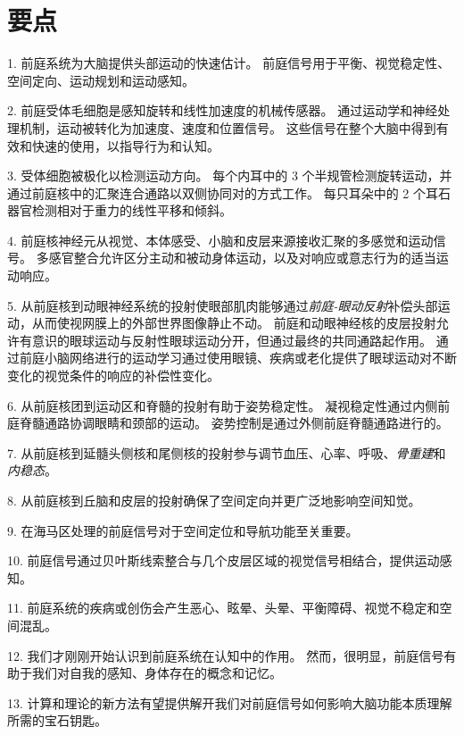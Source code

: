 \section{要点}

1. 前庭系统为大脑提供头部运动的快速估计。
前庭信号用于平衡、视觉稳定性、空间定向、运动规划和运动感知。


2. 前庭受体毛细胞是感知旋转和线性加速度的机械传感器。
通过运动学和神经处理机制，运动被转化为加速度、速度和位置信号。
这些信号在整个大脑中得到有效和快速的使用，以指导行为和认知。


3. 受体细胞被极化以检测运动方向。
每个内耳中的 3 个半规管检测旋转运动，并通过前庭核中的汇聚连合通路以双侧协同对的方式工作。
每只耳朵中的 2 个耳石器官检测相对于重力的线性平移和倾斜。


4. 前庭核神经元从视觉、本体感受、小脑和皮层来源接收汇聚的多感觉和运动信号。
多感官整合允许区分主动和被动身体运动，以及对响应或意志行为的适当运动响应。


5. 从前庭核到动眼神经系统的投射使眼部肌肉能够通过\textit{前庭-眼动反射}补偿头部运动，从而使视网膜上的外部世界图像静止不动。
前庭和动眼神经核的皮层投射允许有意识的眼球运动与反射性眼球运动分开，但通过最终的共同通路起作用。
通过前庭小脑网络进行的运动学习通过使用眼镜、疾病或老化提供了眼球运动对不断变化的视觉条件的响应的补偿性变化。


6. 从前庭核团到运动区和脊髓的投射有助于姿势稳定性。
凝视稳定性通过内侧前庭脊髓通路协调眼睛和颈部的运动。
姿势控制是通过外侧前庭脊髓通路进行的。


7. 从前庭核到延髓头侧核和尾侧核的投射参与调节血压、心率、呼吸、\textit{骨重建}和\textit{内稳态}。


8. 从前庭核到丘脑和皮层的投射确保了空间定向并更广泛地影响空间知觉。


9. 在海马区处理的前庭信号对于空间定位和导航功能至关重要。


10. 前庭信号通过贝叶斯线索整合与几个皮层区域的视觉信号相结合，提供运动感知。


11. 前庭系统的疾病或创伤会产生恶心、眩晕、头晕、平衡障碍、视觉不稳定和空间混乱。


12. 我们才刚刚开始认识到前庭系统在认知中的作用。
然而，很明显，前庭信号有助于我们对自我的感知、身体存在的概念和记忆。


13. 计算和理论的新方法有望提供解开我们对前庭信号如何影响大脑功能本质理解所需的宝石钥匙。




